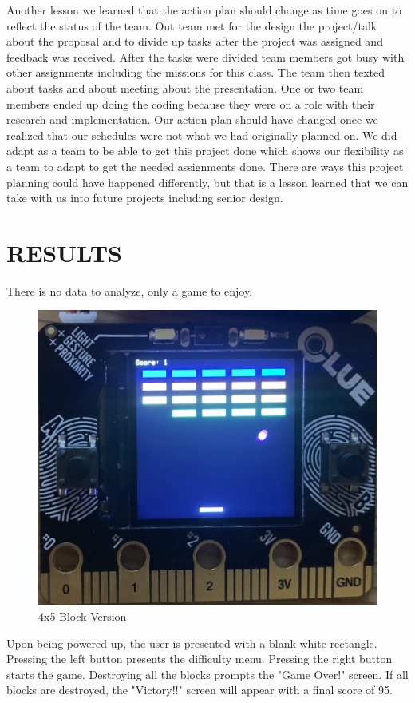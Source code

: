 \documentclass[12pt]{article}
\begin{document}
Another lesson we learned that the action plan should change as time goes on to reflect the status of the team. Out team met for the design the project/talk about the proposal and to divide up tasks after the project was assigned and feedback was received. After the tasks were divided team members got busy with other assignments including the missions for this class. The team then texted about tasks and about meeting about the presentation. One or two team members ended up doing the coding because they were on a role with their research and implementation. Our action plan should have changed once we realized that our schedules were not what we had originally planned on. We did adapt as a team to be able to get this project done which shows our flexibility as a team to adapt to get the needed assignments done. There are ways this project planning could have happened differently, but that is a lesson learned that we can take with us into future projects including senior design.

\pagebreak

\section{RESULTS}
There is no data to analyze, only a game to enjoy.


\begin{figure}[!t]
\centering
\includegraphics[width=4.5in]{images/IMG_2932.jpg}
\caption{4x5 Block Version}
\label{fig:gameover}
\end{figure}


Upon being powered up, the user is presented with a blank white rectangle. Pressing the left button presents the difficulty menu. Pressing the right button starts the game. Destroying all the blocks prompts the "Game Over!" screen. If all blocks are destroyed, the "Victory!!" screen will appear with a final score of 95.
\end{document}
